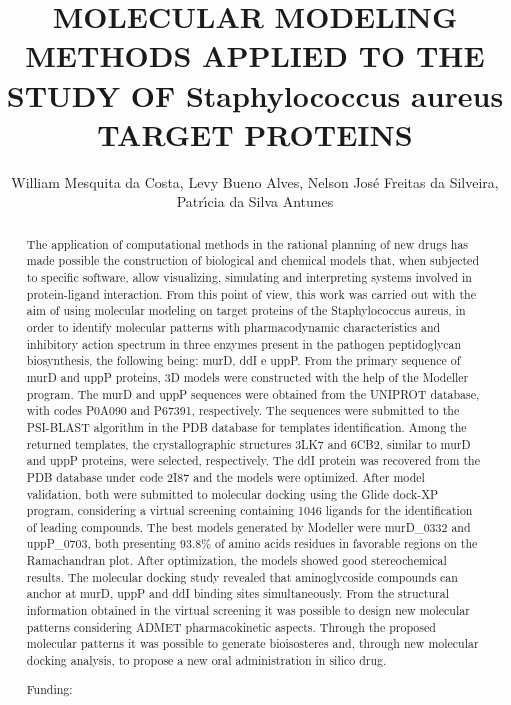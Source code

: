 \documentclass[twoside]{article}
\title{\vspace{-15mm}\fontsize{24pt}{10pt}\selectfont\textbf{ MOLECULAR MODELING METHODS APPLIED TO THE STUDY OF Staphylococcus aureus TARGET PROTEINS }} %
\author{ William Mesquita da Costa, Levy Bueno Alves, Nelson Jos\'e Freitas da Silveira, Patr\'{\i}cia da Silva Antunes }
\affil{ Universidade Federal de Alfenas }
\date{}
\begin{document}
  
  
  \maketitle %
  
  
  \thispagestyle{fancy} %
  
  
  \begin{abstract}
  The application of computational methods in the rational planning of new drugs has made possible the construction of biological and chemical models that,  when subjected to specific software,  allow visualizing,  simulating and interpreting systems involved in protein-ligand interaction. From this point of view,  this work was carried out with the aim of using molecular modeling on target proteins of the Staphylococcus aureus,  in order to identify molecular patterns with pharmacodynamic characteristics and inhibitory action spectrum in three enzymes present in the pathogen peptidoglycan biosynthesis,  the following being: murD,  ddI  e uppP. From the primary sequence of murD and uppP proteins,  3D models were constructed with the help of the Modeller program. The murD and uppP sequences were obtained from the UNIPROT database,  with codes P0A090 and P67391,  respectively. The sequences were submitted to the PSI-BLAST algorithm in the PDB database for templates identification. Among the returned templates,  the crystallographic structures 3LK7 and 6CB2,  similar to murD and uppP proteins,  were selected,  respectively. The ddI protein was recovered from the PDB database under code 2I87 and the models were optimized. After model validation,  both were submitted to molecular docking using the Glide dock-XP program,  considering a virtual screening containing 1046 ligands for the identification of leading compounds. The best models generated by Modeller were murD\_0332 and uppP\_0703,  both presenting 93.8\% of amino acids residues in favorable regions on the Ramachandran plot. After optimization,  the models showed good stereochemical results. The molecular docking study revealed that aminoglycoside compounds can anchor at murD,  uppP and ddI binding sites simultaneously. From the structural information obtained in the virtual screening it was possible to design new molecular patterns considering ADMET pharmacokinetic aspects. Through the proposed molecular patterns it was possible to generate bioisosteres and,  through new molecular docking analysis,  to propose a new oral administration in silico drug.
  
  Funding:  \\ 
  \end{abstract}
  
\end{document}
